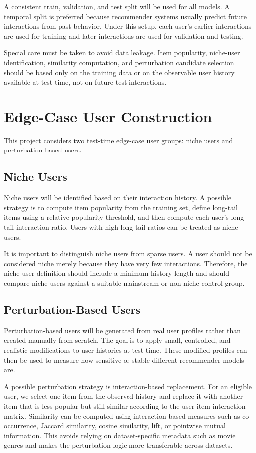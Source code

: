 \documentclass[sigconf]{acmart}
\begin{document}
A consistent train, validation, and test split will be used for all models. A temporal split is preferred because recommender systems usually predict future interactions from past behavior. Under this setup, each user's earlier interactions are used for training and later interactions are used for validation and testing.

Special care must be taken to avoid data leakage. Item popularity, niche-user identification, similarity computation, and perturbation candidate selection should be based only on the training data or on the observable user history available at test time, not on future test interactions.

\section{Edge-Case User Construction}
This project considers two test-time edge-case user groups: niche users and perturbation-based users.

\subsection{Niche Users}
Niche users will be identified based on their interaction history. A possible strategy is to compute item popularity from the training set, define long-tail items using a relative popularity threshold, and then compute each user's long-tail interaction ratio. Users with high long-tail ratios can be treated as niche users.

It is important to distinguish niche users from sparse users. A user should not be considered niche merely because they have very few interactions. Therefore, the niche-user definition should include a minimum history length and should compare niche users against a suitable mainstream or non-niche control group.

\subsection{Perturbation-Based Users}
Perturbation-based users will be generated from real user profiles rather than created manually from scratch. The goal is to apply small, controlled, and realistic modifications to user histories at test time. These modified profiles can then be used to measure how sensitive or stable different recommender models are.

A possible perturbation strategy is interaction-based replacement. For an eligible user, we select one item from the observed history and replace it with another item that is less popular but still similar according to the user-item interaction matrix. Similarity can be computed using interaction-based measures such as co-occurrence, Jaccard similarity, cosine similarity, lift, or pointwise mutual information. This avoids relying on dataset-specific metadata such as movie genres and makes the perturbation logic more transferable across datasets.
\end{document}
